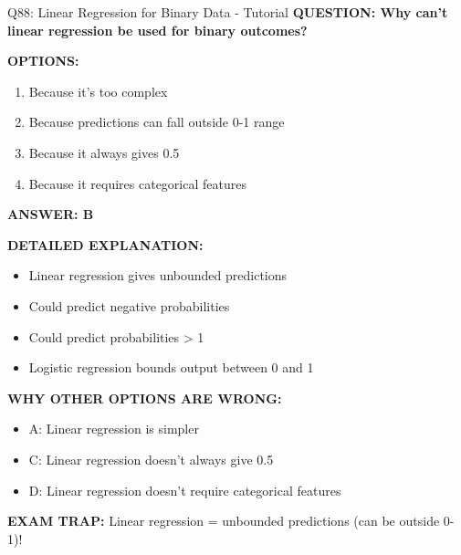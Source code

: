 \documentclass[8pt]{beamer}
\begin{document}
	\begin{frame}{Q88: Linear Regression for Binary Data - Tutorial}
		\fontsize{6.5}{7.5}\selectfont
		\textbf{QUESTION: Why can't linear regression be used for binary outcomes?}
		
		\vspace{0.1cm}
		\textbf{OPTIONS:}
		\begin{enumerate}
			\item Because it's too complex
			\item Because predictions can fall outside 0-1 range
			\item Because it always gives 0.5
			\item Because it requires categorical features
		\end{enumerate}
		
		\vspace{0.1cm}
		\textcolor{myblue}{\textbf{ANSWER: B}}
		
		\vspace{0.1cm}
		\textbf{DETAILED EXPLANATION:}
		\begin{itemize}
			\item Linear regression gives unbounded predictions
			\item Could predict negative probabilities
			\item Could predict probabilities > 1
			\item Logistic regression bounds output between 0 and 1
		\end{itemize}
		
		\vspace{0.1cm}
		\textcolor{myred}{\textbf{WHY OTHER OPTIONS ARE WRONG:}}
		\begin{itemize}
			\item \textcolor{myred}{A:} Linear regression is simpler
			\item \textcolor{myred}{C:} Linear regression doesn't always give 0.5
			\item \textcolor{myred}{D:} Linear regression doesn't require categorical features
		\end{itemize}
		
		\textcolor{myred}{\textbf{EXAM TRAP:}} Linear regression = \textcolor{myblue}{unbounded predictions} (can be outside 0-1)!
	\end{frame}
	
\end{document}
